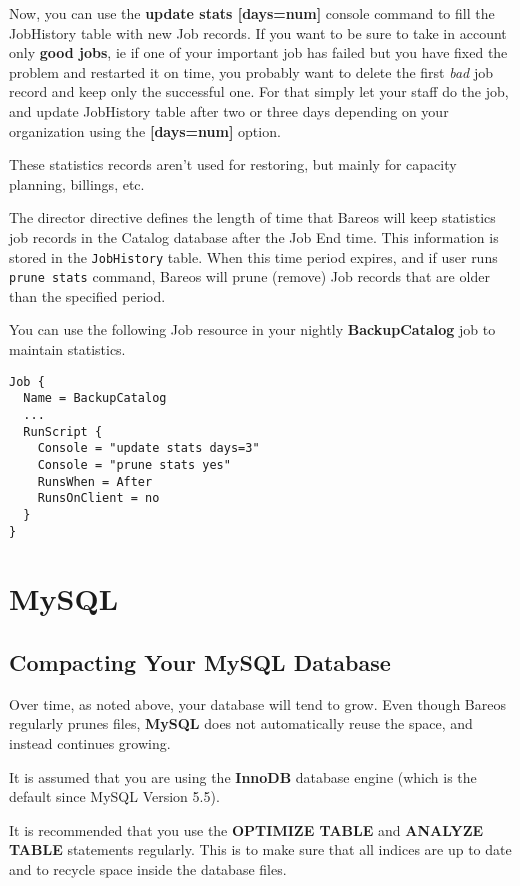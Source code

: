 Now, you can use the \textbf{update stats [days=num]} console command to fill
the JobHistory table with new Job records. If you want to be sure to take in
account only \textbf{good jobs}, ie if one of your important job has failed but
you have fixed the problem and restarted it on time, you probably want to
delete the first \textit{bad} job record and keep only the successful one. For
that simply let your staff do the job, and update JobHistory table after two or
three days depending on your organization using the \textbf{[days=num]} option.

These statistics records aren't used for restoring, but mainly for
capacity planning, billings, etc.

The  director directive defines
the length of time that Bareos will keep statistics job records in the Catalog
database after the Job End time. This information is stored in the \texttt{JobHistory} table.
When this time
period expires, and if user runs \texttt{prune stats} command, Bareos will
prune (remove) Job records that are older than the specified period.

You can use the following Job resource in your nightly \textbf{BackupCatalog}
job to maintain statistics.
\begin{verbatim}
Job {
  Name = BackupCatalog
  ...
  RunScript {
    Console = "update stats days=3"
    Console = "prune stats yes"
    RunsWhen = After
    RunsOnClient = no
  }
}
\end{verbatim}



\section{MySQL}
\label{CompactingMySQL}
\subsection{Compacting Your MySQL Database}

Over time, as noted above, your database will tend to grow.
Even though Bareos regularly prunes files, {\bf MySQL} does not automatically
reuse the space, and instead continues growing.

It is assumed that you are using the {\bf InnoDB} database engine (which is the default since MySQL Version 5.5).

It is recommended that you use the {\bf OPTIMIZE TABLE} and {\bf ANALYZE TABLE}
statements regularly. This is to make sure that all indices are up to date
and to recycle space inside the database files.


